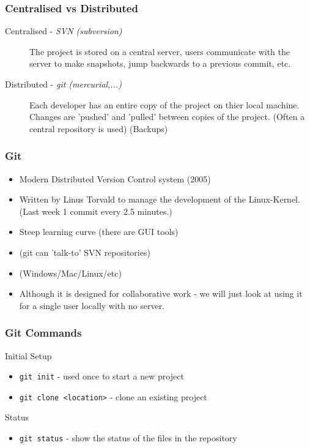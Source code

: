 \documentclass{beamer}
\begin{document}
\begin{frame}
\frametitle{Centralised vs Distributed}
\begin{block}{}
\begin{description}
\item[Centralised - \emph{SVN (subversion)} ] The project is stored on a central server, users communicate with the server to make snapshots, jump backwards to a previous commit, etc.
\item[Distributed - \emph{git (mercurial,...)} ] Each developer has an entire copy of the project on thier local machine. Changes are 'pushed' and 'pulled' between copies of the project. (Often a central repository is used) (Backups)
\end{description}
\end{block}
\end{frame}
%
\begin{frame}
\frametitle{Git}
\begin{block}{}
\begin{itemize}
\item Modern Distributed Version Control system (2005)
\item Written by Linus Torvald to manage the development of the Linux-Kernel. (Last week 1 commit every 2.5 minutes.)
\item Steep learning curve (there are GUI tools)
\item (git can 'talk-to' SVN repositories)
\item (Windows/Mac/Linux/etc)
\item Although it is designed for collaborative work - we will just look at
using it for a single user locally with no server.
\end{itemize}
\end{block}
\end{frame}


\begin{frame}[fragile]
\frametitle{Git Commands}
%
\begin{block}{Initial Setup}
\begin{itemize}
\item \verb|git init| - used once to start a new project
\item \verb|git clone <location>| - clone an existing project
\end{itemize}
\end{block}


\begin{block}{Status}
\begin{itemize}
\item \verb|git status| - show the status of the files in the repository
\end{itemize}
\end{block}

\end{frame}
\end{document}
